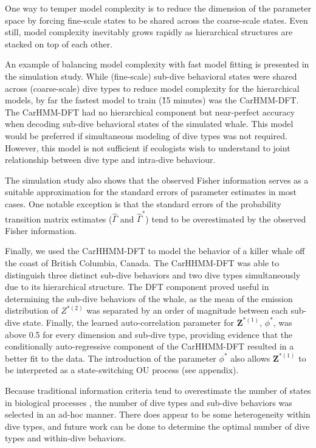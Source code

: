 One way to temper model complexity is to reduce the dimension of the parameter space by forcing fine-scale states to be shared across the coarse-scale states. Even still, model complexity inevitably grows rapidly as hierarchical structures are stacked on top of each other.

An example of balancing model complexity with fast model fitting is presented in the simulation study. While (fine-scale) sub-dive behavioral states were shared across (coarse-scale) dive types to reduce model complexity for the hierarchical models, by far the fastest model to train (\~ 15 minutes) was the CarHMM-DFT. The CarHMM-DFT had no hierarchical component but near-perfect accuracy when decoding sub-dive behavioral states of the simulated whale. This model would be preferred if simultaneous modeling of dive types was not required. However, this model is not sufficient if ecologists wish to understand to joint relationship between dive type and intra-dive behaviour. 

The simulation study also shows that the observed Fisher information serves as a suitable approximation for the standard errors of parameter estimates in most cases. One notable exception is that the standard errors of the probability transition matrix estimates ($\hat \Gamma$ and $\hat \Gamma^*$) tend to be overestimated by the observed Fisher information.

Finally, we used the CarHHMM-DFT to model the behavior of a killer whale off the coast of British Columbia, Canada. The CarHHMM-DFT was able to distinguish three distinct sub-dive behaviors and two dive types simultaneously due to its hierarchical structure. The DFT component proved useful in determining the sub-dive behaviors of the whale, as the mean of the emission distribution of $Z^{*(2)}$ was separated by an order of magnitude between each sub-dive state. Finally, the learned auto-correlation parameter for $\mathbf{Z}^{*(1)}$, $\phi^*$, was above 0.5 for every dimension and sub-dive type, providing evidence that the conditionally auto-regressive component of the CarHHMM-DFT resulted in a better fit to the data. The introduction of the parameter $\phi^*$ also allows $\mathbf{Z}^{*(1)}$ to be interpreted as a state-switching OU process (see appendix).

Because traditional information criteria tend to overestimate the number of states in biological processes \citep{Pohle:2017}, the number of dive types and sub-dive behaviors was selected in an ad-hoc manner. There does appear to be some heterogeneity within dive types, and future work can be done to determine the optimal number of dive types and within-dive behaviors.